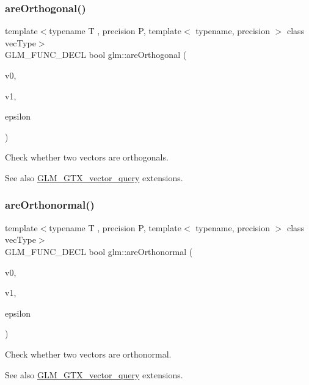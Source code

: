 \subsubsection{\texorpdfstring{are\+Orthogonal()}{areOrthogonal()}}
{\footnotesize\ttfamily template$<$typename T , precision P, template$<$ typename, precision $>$ class vec\+Type$>$ \\
G\+L\+M\+\_\+\+F\+U\+N\+C\+\_\+\+D\+E\+CL bool glm\+::are\+Orthogonal (\begin{DoxyParamCaption}\item[{vec\+Type$<$ T, P $>$ const \&}]{v0,  }\item[{vec\+Type$<$ T, P $>$ const \&}]{v1,  }\item[{T const \&}]{epsilon }\end{DoxyParamCaption})}

Check whether two vectors are orthogonals. \begin{DoxySeeAlso}{See also}
\hyperlink{group__gtx__vector__query}{G\+L\+M\+\_\+\+G\+T\+X\+\_\+vector\+\_\+query} extensions. 
\end{DoxySeeAlso}
\mbox{\label{group__gtx__vector__query_ga89c82bc60e5b84e4489b74c15a134caf}} 
\subsubsection{\texorpdfstring{are\+Orthonormal()}{areOrthonormal()}}
{\footnotesize\ttfamily template$<$typename T , precision P, template$<$ typename, precision $>$ class vec\+Type$>$ \\
G\+L\+M\+\_\+\+F\+U\+N\+C\+\_\+\+D\+E\+CL bool glm\+::are\+Orthonormal (\begin{DoxyParamCaption}\item[{vec\+Type$<$ T, P $>$ const \&}]{v0,  }\item[{vec\+Type$<$ T, P $>$ const \&}]{v1,  }\item[{T const \&}]{epsilon }\end{DoxyParamCaption})}

Check whether two vectors are orthonormal. \begin{DoxySeeAlso}{See also}
\hyperlink{group__gtx__vector__query}{G\+L\+M\+\_\+\+G\+T\+X\+\_\+vector\+\_\+query} extensions. 
\end{DoxySeeAlso}
\mbox{\label{group__gtx__vector__query_ga93ecd4137480483ce1af0de8bbbf6546}} 
